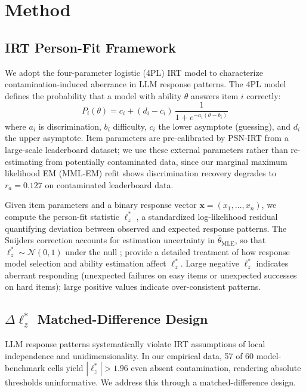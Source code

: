\section{Method}
\label{sec:method}

\subsection{IRT Person-Fit Framework}
\label{sec:framework}

We adopt the four-parameter logistic (4PL) IRT model to characterize contamination-induced aberrance in LLM response patterns.
The 4PL model defines the probability that a model with ability $\theta$ answers item $i$ correctly:
\begin{equation}
  P_i(\theta) = c_i + (d_i - c_i)\,\frac{1}{1 + e^{-a_i(\theta - b_i)}}
  \label{eq:4pl}
\end{equation}
where $a_i$ is discrimination, $b_i$ difficulty, $c_i$ the lower asymptote (guessing), and $d_i$ the upper asymptote.
Item parameters are pre-calibrated by PSN-IRT \citep{psnirt2026} from a large-scale leaderboard dataset; we use these external parameters rather than re-estimating from potentially contaminated data, since our marginal maximum likelihood EM (MML-EM) refit shows discrimination recovery degrades to $r_a{=}0.127$ on contaminated leaderboard data.

Given item parameters and a binary response vector $\mathbf{x} = (x_1, \ldots, x_n)$, we compute the person-fit statistic $\ell_z^*$ \citep{snijders2001}, a standardized log-likelihood residual quantifying deviation between observed and expected response patterns.
The Snijders correction accounts for estimation uncertainty in $\hat{\theta}_{\text{MLE}}$, so that $\ell_z^* \sim \mathcal{N}(0,1)$ under the null \citep{drasgow1985, snijders2001}; \citet{magis2012} provide a detailed treatment of how response model selection and ability estimation affect $\ell_z^*$.
Large negative $\ell_z^*$ indicates aberrant responding (unexpected failures on easy items or unexpected successes on hard items); large positive values indicate over-consistent patterns.

\subsection{$\Delta\ell_z^*$ Matched-Difference Design}
\label{sec:did}

LLM response patterns systematically violate IRT assumptions of local independence and unidimensionality.
In our empirical data, 57 of 60 model-benchmark cells yield $|\ell_z^*| > 1.96$ even absent contamination, rendering absolute thresholds uninformative.
We address this through a matched-difference design.

